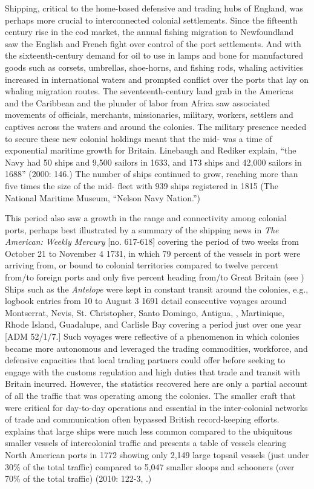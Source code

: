 Shipping, critical to the home-based defensive and trading hubs of England, was perhaps more crucial to interconnected colonial settlements. Since the fifteenth century rise in the cod market, the annual fishing migration to Newfoundland saw the English and French fight over control of the port settlements. And with the sixteenth-century demand for oil to use in lamps and bone for manufactured goods such as corsets, umbrellas, shoe-horns, and fishing rods, whaling activities increased in international waters and prompted conflict over the ports that lay on whaling migration routes. The seventeenth-century land grab in the Americas and the Caribbean and the plunder of labor from Africa saw associated movements of officials, merchants, missionaries, military, workers, settlers and captives across the waters and around the colonies. The military presence needed to secure these new colonial holdings meant that the mid- was a time of exponential maritime growth for Britain. Linebaugh and Rediker explain, “the Navy had 50 ships and 9,500 sailors in 1633, and 173 ships and 42,000 sailors in 1688” (2000: 146.)  The number of ships continued to grow, reaching more than five times the size of the mid- fleet with 939 ships registered in 1815 (The National Maritime Museum, “Nelson Navy Nation.”) 

This period also saw a growth in the range and connectivity among colonial ports, perhaps best illustrated by a summary of the shipping news in \textit{The American: Weekly Mercury} [no. 617-618] covering the period of two weeks from October 21 to November 4 1731, in which 79 percent of the vessels in port were arriving from, or bound to colonial territories compared to twelve percent from/to foreign ports and only five percent heading from/to Great Britain (see ) Ships such as the \textit{Antelope} were kept in constant transit around the colonies, e.g., logbook entries from 10 \citealt{June1690} to August 3 1691 detail consecutive voyages around Montserrat, Nevis, St. Christopher, Santo Domingo, Antigua, , Martinique, Rhode Island, Guadalupe, and Carlisle Bay covering a period just over one year [ADM 52/1/7.] Such voyages were reflective of a phenomenon in which colonies became more autonomous and leveraged the trading commodities, workforce, and defensive capacities that local trading partners could offer before seeking to engage with the customs regulation and high duties that trade and transit with Britain incurred. However, the statistics recovered here are only a partial account of all the traffic that was operating among the colonies. The smaller craft that were critical for day-to-day operations and essential in the inter-colonial networks of trade and communication often bypassed British record-keeping efforts. \citeauthor{Jarvis2010} explains that large ships were much less common compared to the ubiquitous smaller vessels of intercolonial traffic and presents a table of vessels clearing North American ports in 1772 showing only 2,149 large topsail vessels (just under 30\% of the total traffic) compared to 5,047 smaller sloops and schooners (over 70\% of the total traffic) (2010: 122-3, .) 

